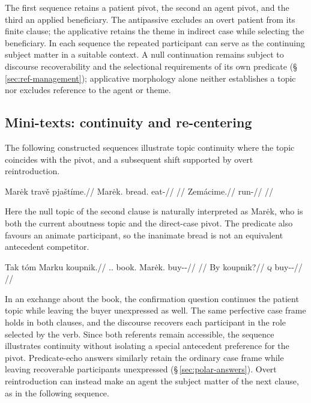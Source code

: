 \noindent The first sequence retains a patient pivot, the second an agent
pivot, and the third an applied beneficiary. The antipassive excludes an overt
patient from its finite clause; the applicative retains the theme in indirect
case while selecting the beneficiary. In each sequence the repeated
participant can serve as the continuing subject matter in a suitable context.
A null continuation remains subject to discourse recoverability and the selectional
requirements of its own predicate (§\,\ref{sec:ref-management}); applicative
morphology alone neither establishes a topic nor excludes reference to the
agent or theme.

\subsection{Mini-texts: continuity and re-centering}

The following constructed sequences illustrate topic continuity where the
 topic coincides with the pivot, and a subsequent shift supported by overt
 reintroduction.

\pex
\a
\begingl
\gla Marėk travě pjaštíme.//
\glb Marėk.\Dir{} bread.\Ind{} eat-\Prog{}//
\glft {}//
\endgl
\a
\begingl
\gla Zemácime.//
\glb run-\Prog{}//
\glft {} //
\endgl
\xe

\noindent Here the null topic of the second clause is naturally interpreted as
Marėk, who is both the current aboutness topic and the direct-case pivot.
The predicate  also favours an animate participant, so the
inanimate bread is not an equivalent antecedent competitor.

\pex
\a
\begingl
\gla Tak tóm Marku koupnik.//
\glb \Dem{}.\Prox{}.\Dir{} book.\Dir{} Marėk.\Trs{} buy-\Trs{}-\Pf{}//
\glft {}//
\endgl
\a
\begingl
\gla By koupnik?//
\glb \textsc{q} buy-\Trs{}-\Pf{}//
\glft {}
 //
\endgl
\xe

\noindent In an exchange about the book, the confirmation question continues
 the patient topic while leaving the buyer unexpressed as well. The same
 perfective case frame holds in both clauses, and the discourse recovers each
 participant in the role selected by the verb. Since both referents remain
 accessible, the sequence illustrates continuity without isolating a special
 antecedent preference for the pivot. Predicate-echo answers similarly retain
 the ordinary case frame while leaving recoverable participants unexpressed
 (§\,\ref{sec:polar-answers}). Overt reintroduction can instead make
 an agent the subject matter of the next clause, as in the following sequence.

